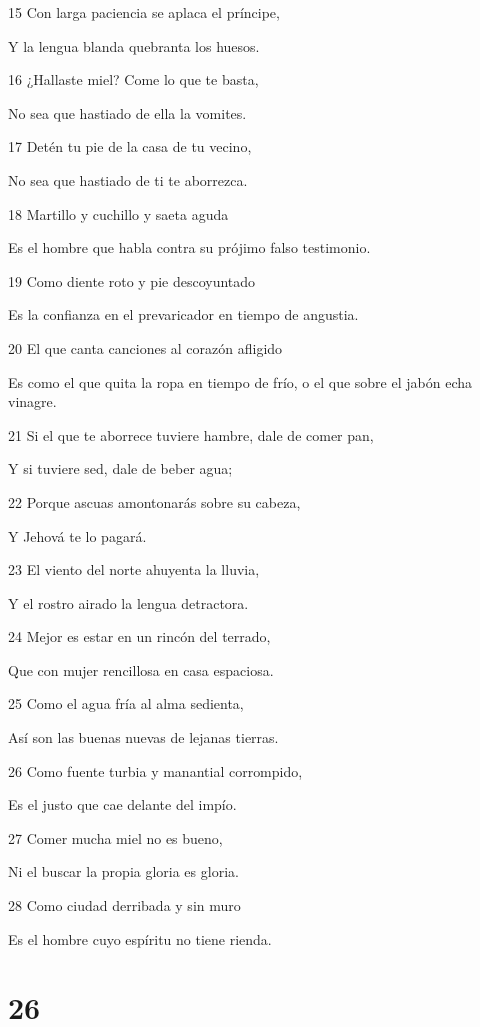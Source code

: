 \par 15 Con larga paciencia se aplaca el príncipe,
\par Y la lengua blanda quebranta los huesos.
\par 16 ¿Hallaste miel? Come lo que te basta,
\par No sea que hastiado de ella la vomites.
\par 17 Detén tu pie de la casa de tu vecino,
\par No sea que hastiado de ti te aborrezca.
\par 18 Martillo y cuchillo y saeta aguda
\par Es el hombre que habla contra su prójimo falso testimonio.
\par 19 Como diente roto y pie descoyuntado
\par Es la confianza en el prevaricador en tiempo de angustia.
\par 20 El que canta canciones al corazón afligido
\par Es como el que quita la ropa en tiempo de frío, o el que sobre el jabón echa vinagre.
\par 21 Si el que te aborrece tuviere hambre, dale de comer pan,
\par Y si tuviere sed, dale de beber agua;
\par 22 Porque ascuas amontonarás sobre su cabeza, 
\par Y Jehová te lo pagará.
\par 23 El viento del norte ahuyenta la lluvia,
\par Y el rostro airado la lengua detractora.
\par 24 Mejor es estar en un rincón del terrado,
\par Que con mujer rencillosa en casa espaciosa.
\par 25 Como el agua fría al alma sedienta,
\par Así son las buenas nuevas de lejanas tierras.
\par 26 Como fuente turbia y manantial corrompido,
\par Es el justo que cae delante del impío.
\par 27 Comer mucha miel no es bueno,
\par Ni el buscar la propia gloria es gloria.
\par 28 Como ciudad derribada y sin muro
\par Es el hombre cuyo espíritu no tiene rienda.

\chapter{26}


